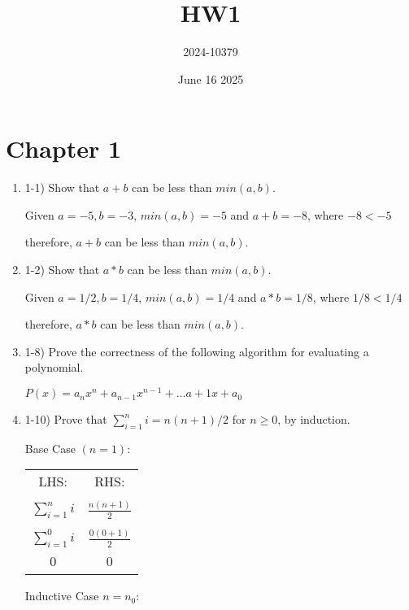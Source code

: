\documentclass{article}
\title{HW1}
\author{2024-10379}
\date{June 16 2025}
\begin{document}
\maketitle

\section{Chapter 1}
\begin{enumerate}
    \item 1-1) Show that $a + b$ can be less than $min(a,b)$.
    
    Given $a = -5, b = -3$, $min(a,b) = -5$ and $a+b = -8$, where $-8 < -5$
    
    therefore, $a+b$ can be less than $min(a,b)$.
    
    \item 1-2) Show that $ a * b $ can be less than $min(a,b)$.
    
    Given $a = 1/2, b = 1/4$, $min(a,b) = 1/4$ and $a*b = 1/8$, where $1/8 < 1/4$
    
    therefore, $a*b$ can be less than $min(a,b)$.
    
    \item 1-8) Prove the correctness of the following algorithm for evaluating a polynomial.

    $P(x) = a_nx^n + a_{n-1}x^{n-1} + \ldots a+1x + a_0$
    
    
    \item 1-10) Prove that $\sum_{i=1}^{n}i=n(n+1)/2 $ for $n \ge 0 $, by induction.
    
    Base Case $(n = 1)$:
    \begin{center}
        \begin{tabular}{ c | c } 
        LHS: & RHS: \\ & \\
        $ \sum_{i=1}^{n} i $ & $ \frac{n(n+1)}{2}$ \\ \\
        $ \sum_{i=1}^{0} i $ & $ \frac{0(0+1)}{2}$ \\ \\
        $ 0 $ & $ 0 $ \\ \\
        \end{tabular}
    \end{center}
    Inductive Case $ n = n_0 $:
    

\end{enumerate}
\end{document}
